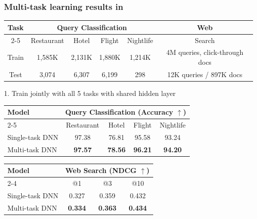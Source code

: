 \begin{frame}[plain]
\frametitle{Multi-task learning results in \cite{liu15multitask}}

\begin{table}
\centering
\tabcolsep=0.08cm
\begin{tabular}{|c | c | c | c | c || c | }
\hline
\multirow{2}{*}{Task}		&\multicolumn{4}{|c||}{Query Classification} & Web \\ \cline{2-5}
\multicolumn{1}{ |c| }{} 	&Restaurant	& Hotel  	&Flight		&Nightlife	  &Search\\ \hline \hline
Train							&1,585K		&2,131K	&1,880K	&1,214K	  &4M queries, click-through docs \\ \hline
Test									&3,074			&6,307		&6,199		&298		  &12K queries / 897K docs \\ \hline
\end{tabular}
\end{table}

1. Train jointly with all 5 tasks with shared hidden layer
\begin{table}[ht!]
\centering
\tabcolsep=0.09cm
\begin{tabular}{ l | c | c | c | c }
\hline
\multirow{2}{*}{Model}	&\multicolumn{4}{|c}{Query Classification (Accuracy $\uparrow$)} \\ \cline{2-5}
\multicolumn{1}{ c | }{} 	&Restaurant	& Hotel  	&Flight		&Nightlife	 \\ \hline \hline
Single-task DNN									&97.38			&76.81		&95.58		&93.24		 \\ \hline
Multi-task DNN							&\textbf{97.57}			&\textbf{78.56}		&\textbf{96.21}		&\textbf{94.20}		 \\ \hline
\end{tabular}
\end{table}

\begin{table}[ht!]
\centering
\tabcolsep=0.08cm
\begin{tabular}{l || c | c | c }
\hline
\multirow{2}{*}{Model}					&\multicolumn{3}{|c}{Web Search (NDCG $\uparrow$)} \\ \cline{2-4} 
																				&@1 				&@3 				&@10\\ \hline \hline
Single-task DNN	&0.327				&0.359				&0.432			\\ \hline
Multi-task DNN &\textbf{0.334}				&\textbf{0.363}				&\textbf{0.434} 		\\ \hline
\end{tabular}
\end{table}
\end{frame}
